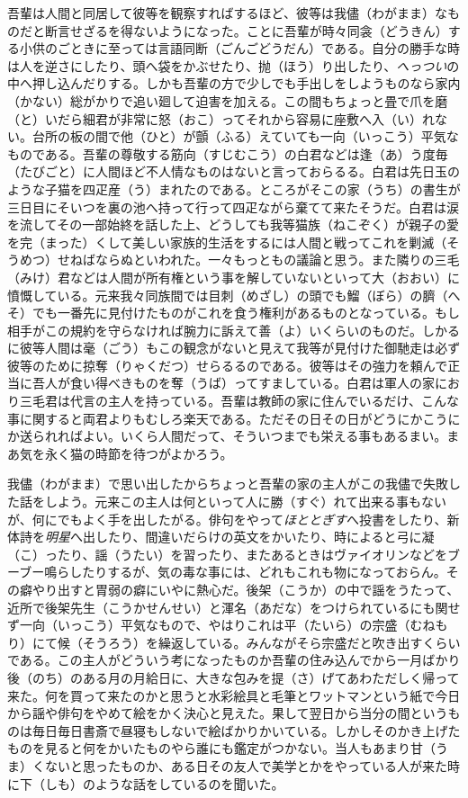 \documentclass{book}
\begin{document}
吾輩は人間と同居して彼等を観察すればするほど、彼等は我儘（わがまま）なものだと断言せざるを得ないようになった。ことに吾輩が時々同衾（どうきん）する小供のごときに至っては言語同断（ごんごどうだん）である。自分の勝手な時は人を逆さにしたり、頭へ袋をかぶせたり、抛（ほう）り出したり、\emph{へっつい}の中へ押し込んだりする。しかも吾輩の方で少しでも手出しをしようものなら家内（かない）総がかりで追い廻して迫害を加える。この間もちょっと畳で爪を磨（と）いだら細君が非常に怒（おこ）ってそれから容易に座敷へ入（い）れない。台所の板の間で他（ひと）が顫（ふる）えていても一向（いっこう）平気なものである。吾輩の尊敬する筋向（すじむこう）の白君などは逢（あ）う度毎（たびごと）に人間ほど不人情なものはないと言っておらるる。白君は先日玉のような子猫を四疋産（う）まれたのである。ところがそこの家（うち）の書生が三日目にそいつを裏の池へ持って行って四疋ながら棄てて来たそうだ。白君は涙を流してその一部始終を話した上、どうしても我等猫族（ねこぞく）が親子の愛を完（まった）くして美しい家族的生活をするには人間と戦ってこれを剿滅（そうめつ）せねばならぬといわれた。一々もっともの議論と思う。また隣りの三毛（みけ）君などは人間が所有権という事を解していないといって大（おおい）に憤慨している。元来我々同族間では目刺（めざし）の頭でも鰡（ぼら）の臍（へそ）でも一番先に見付けたものがこれを食う権利があるものとなっている。もし相手がこの規約を守らなければ腕力に訴えて善（よ）いくらいのものだ。しかるに彼等人間は毫（ごう）もこの観念がないと見えて我等が見付けた御馳走は必ず彼等のために掠奪（りゃくだつ）せらるるのである。彼等はその強力を頼んで正当に吾人が食い得べきものを奪（うば）ってすましている。白君は軍人の家におり三毛君は代言の主人を持っている。吾輩は教師の家に住んでいるだけ、こんな事に関すると両君よりもむしろ楽天である。ただその日その日がどうにかこうにか送られればよい。いくら人間だって、そういつまでも栄える事もあるまい。まあ気を永く猫の時節を待つがよかろう。

我儘（わがまま）で思い出したからちょっと吾輩の家の主人がこの我儘で失敗した話をしよう。元来この主人は何といって人に勝（すぐ）れて出来る事もないが、何にでもよく手を出したがる。俳句をやって\emph{ほととぎす}へ投書をしたり、新体詩を\emph{明星}へ出したり、間違いだらけの英文をかいたり、時によると弓に凝（こ）ったり、謡（うたい）を習ったり、またあるときはヴァイオリンなどをブーブー鳴らしたりするが、気の毒な事には、どれもこれも物になっておらん。その癖やり出すと胃弱の癖にいやに熱心だ。後架（こうか）の中で謡をうたって、近所で後架先生（こうかせんせい）と渾名（あだな）をつけられているにも関せず一向（いっこう）平気なもので、やはりこれは平（たいら）の宗盛（むねもり）にて候（そうろう）を繰返している。みんながそら宗盛だと吹き出すくらいである。この主人がどういう考になったものか吾輩の住み込んでから一月ばかり後（のち）のある月の月給日に、大きな包みを提（さ）げてあわただしく帰って来た。何を買って来たのかと思うと水彩絵具と毛筆とワットマンという紙で今日から謡や俳句をやめて絵をかく決心と見えた。果して翌日から当分の間というものは毎日毎日書斎で昼寝もしないで絵ばかりかいている。しかしそのかき上げたものを見ると何をかいたものやら誰にも鑑定がつかない。当人もあまり甘（うま）くないと思ったものか、ある日その友人で美学とかをやっている人が来た時に下（しも）のような話をしているのを聞いた。
\end{document}

